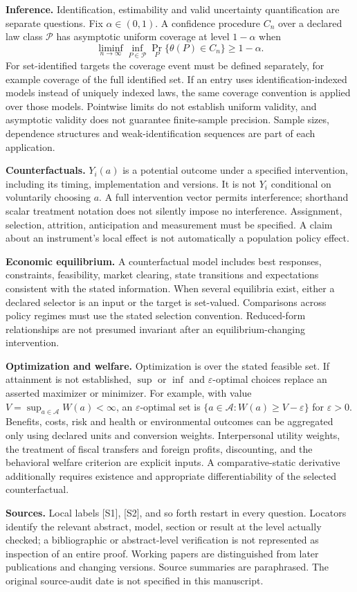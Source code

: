 \documentclass[11pt,a4paper]{article}
\begin{document}
\textbf{Inference.} Identification, estimability and valid uncertainty quantification are separate questions. Fix $\alpha\in(0,1)$. A confidence procedure $C_n$ over a declared law class $\mathcal P$ has asymptotic uniform coverage at level $1-\alpha$ when
\[
\liminf_{n\to\infty}\inf_{P\in\mathcal P}\Pr_P\{\theta(P)\in C_n\}\geq1-\alpha.
\]
For set-identified targets the coverage event must be defined separately, for example coverage of the full identified set. If an entry uses identification-indexed models instead of uniquely indexed laws, the same coverage convention is applied over those models. Pointwise limits do not establish uniform validity, and asymptotic validity does not guarantee finite-sample precision. Sample sizes, dependence structures and weak-identification sequences are part of each application.

\textbf{Counterfactuals.} $Y_i(a)$ is a potential outcome under a specified intervention, including its timing, implementation and versions. It is not $Y_i$ conditional on voluntarily choosing $a$. A full intervention vector permits interference; shorthand scalar treatment notation does not silently impose no interference. Assignment, selection, attrition, anticipation and measurement must be specified. A claim about an instrument's local effect is not automatically a population policy effect.

\textbf{Economic equilibrium.} A counterfactual model includes best responses, constraints, feasibility, market clearing, state transitions and expectations consistent with the stated information. When several equilibria exist, either a declared selector is an input or the target is set-valued. Comparisons across policy regimes must use the stated selection convention. Reduced-form relationships are not presumed invariant after an equilibrium-changing intervention.

\textbf{Optimization and welfare.} Optimization is over the stated feasible set. If attainment is not established, $\sup$ or $\inf$ and $\varepsilon$-optimal choices replace an asserted maximizer or minimizer. For example, with value $V=\sup_{a\in\mathcal A}W(a)<\infty$, an $\varepsilon$-optimal set is $\{a\in\mathcal A:W(a)\geq V-\varepsilon\}$ for $\varepsilon>0$. Benefits, costs, risk and health or environmental outcomes can be aggregated only using declared units and conversion weights. Interpersonal utility weights, the treatment of fiscal transfers and foreign profits, discounting, and the behavioral welfare criterion are explicit inputs. A comparative-static derivative additionally requires existence and appropriate differentiability of the selected counterfactual.

\textbf{Sources.} Local labels [S1], [S2], and so forth restart in every question. Locators identify the relevant abstract, model, section or result at the level actually checked; a bibliographic or abstract-level verification is not represented as inspection of an entire proof. Working papers are distinguished from later publications and changing versions. Source summaries are paraphrased. The original source-audit date is not specified in this manuscript.
\end{document}
